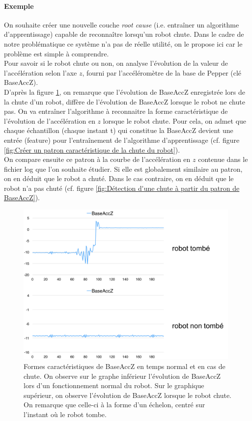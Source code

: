 \paragraph{Exemple} On souhaite créer une nouvelle couche \emph{root cause} (i.e. entraîner un algorithme d'apprentissage) capable de reconnaître lorsqu'un robot chute. Dans le cadre de notre problématique ce système n'a pas de réelle utilité, on le propose ici car le problème est simple à comprendre. \\
Pour savoir si le robot chute ou non, on analyse l'évolution de la valeur de l'accélération selon l'axe $z$, fourni par l'accéléromètre de la base de Pepper (clé BaseAccZ). \\
D'après la figure \ref{fig:Formes caractéristiques de BaseAccZ en temps normal et en cas de chute}, on remarque que l'évolution de BaseAccZ enregistrée lors de la chute d'un robot, diffère de l'évolution de BaseAccZ lorsque le robot ne chute pas. On va entraîner l'algorithme à reconnaitre la forme caractéristique de l'évolution de l'accélération en $z$ lorsque le robot chute. Pour cela, on admet que chaque échantillon (chaque instant t) qui constitue la BaseAccZ devient une entrée (feature) pour l'entraînement de l'algorithme d'apprentissage (cf. figure \ref{fig:Créer un patron caractéristique de la chute du robot}). \\
On compare ensuite ce patron à la courbe de l'accélération en $z$ contenue dans le fichier log que l'on souhaite étudier. Si elle est globalement similaire au patron, on en déduit que le robot a chuté. Dans le cas contraire, on en déduit que le robot n'a pas chuté (cf. figure \ref{fig:Détection d'une chute à partir du patron de BaseAccZ}).

\begin{figure}[H]
	\centering\includegraphics[width=11cm]{images/fall_not_fall.png}
	\caption[Formes caractéristiques de BaseAccZ en temps normal et en cas de chute]{Formes caractéristiques de BaseAccZ en temps normal et en cas de chute. On observe sur le graphe inférieur l'évolution de BaseAccZ lors d'un fonctionnement normal du robot. Sur le graphique supérieur, on observe l'évolution de BaseAccZ lorsque le robot chute. On remarque que celle-ci à la forme d'un échelon, centré sur l'instant où le robot tombe.}
	\label{fig:Formes caractéristiques de BaseAccZ en temps normal et en cas de chute}
\end{figure}

